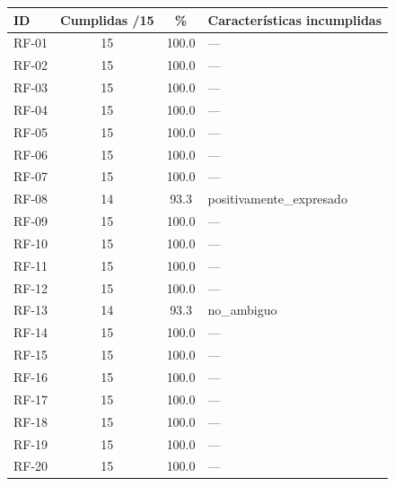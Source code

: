 \begin{longtable}{|l|c|c|l|}
\hline
\rowcolor{uteqverde!25}
\textbf{ID} & \textbf{Cumplidas /15} & \textbf{\%} & \textbf{Caracter\'isticas incumplidas}\\ \hline
\endhead
RF-01 & 15 & 100.0 & ---\\ \hline
RF-02 & 15 & 100.0 & ---\\ \hline
RF-03 & 15 & 100.0 & ---\\ \hline
RF-04 & 15 & 100.0 & ---\\ \hline
RF-05 & 15 & 100.0 & ---\\ \hline
RF-06 & 15 & 100.0 & ---\\ \hline
RF-07 & 15 & 100.0 & ---\\ \hline
RF-08 & 14 & 93.3 & positivamente_expresado\\ \hline
RF-09 & 15 & 100.0 & ---\\ \hline
RF-10 & 15 & 100.0 & ---\\ \hline
RF-11 & 15 & 100.0 & ---\\ \hline
RF-12 & 15 & 100.0 & ---\\ \hline
RF-13 & 14 & 93.3 & no_ambiguo\\ \hline
RF-14 & 15 & 100.0 & ---\\ \hline
RF-15 & 15 & 100.0 & ---\\ \hline
RF-16 & 15 & 100.0 & ---\\ \hline
RF-17 & 15 & 100.0 & ---\\ \hline
RF-18 & 15 & 100.0 & ---\\ \hline
RF-19 & 15 & 100.0 & ---\\ \hline
RF-20 & 15 & 100.0 & ---\\ \hline
\end{longtable}
